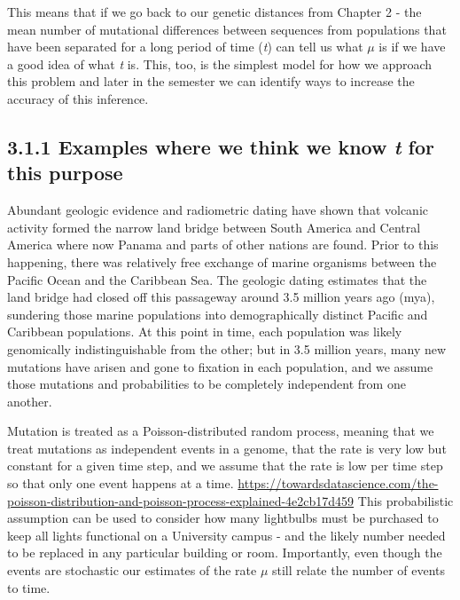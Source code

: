 \documentclass[
]{article}
\begin{document}
This means that if we go back to our genetic distances from Chapter 2 -
the mean number of mutational differences between sequences from
populations that have been separated for a long period of time
(\emph{t}) can tell us what \(\mu\) is if we have a good idea of what
\emph{t} is. This, too, is the simplest model for how we approach this
problem and later in the semester we can identify ways to increase the
accuracy of this inference.

\hypertarget{examples-where-we-think-we-know-t-for-this-purpose}{%
\subsection{\texorpdfstring{3.1.1 Examples where we think we know
\emph{t} for this
purpose}{3.1.1 Examples where we think we know t for this purpose}}\label{examples-where-we-think-we-know-t-for-this-purpose}}

Abundant geologic evidence and radiometric dating have shown that
volcanic activity formed the narrow land bridge between South America
and Central America where now Panama and parts of other nations are
found. Prior to this happening, there was relatively free exchange of
marine organisms between the Pacific Ocean and the Caribbean Sea. The
geologic dating estimates that the land bridge had closed off this
passageway around 3.5 million years ago (mya), sundering those marine
populations into demographically distinct Pacific and Caribbean
populations. At this point in time, each population was likely
genomically indistinguishable from the other; but in 3.5 million years,
many new mutations have arisen and gone to fixation in each population,
and we assume those mutations and probabilities to be completely
independent from one another.

Mutation is treated as a Poisson-distributed random process, meaning
that we treat mutations as independent events in a genome, that the rate
is very low but constant for a given time step, and we assume that the
rate is low per time step so that only one event happens at a time.
\url{https://towardsdatascience.com/the-poisson-distribution-and-poisson-process-explained-4e2cb17d459}
This probabilistic assumption can be used to consider how many
lightbulbs must be purchased to keep all lights functional on a
University campus - and the likely number needed to be replaced in any
particular building or room. Importantly, even though the events are
stochastic our estimates of the rate \(\mu\) still relate the number of
events to time.
\end{document}
